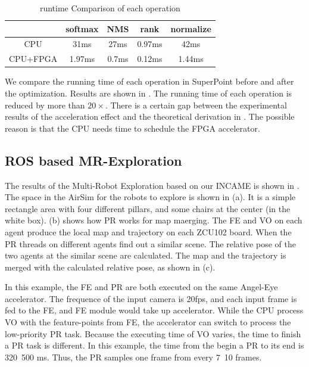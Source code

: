 \begin{table}[t]
  \centering
  \caption{runtime Comparison of each operation}
\begin{tabular}{|c|c|c|c|c|}
  \hline
             &    softmax &        NMS &       rank &  normalize \bigstrut\\
  \hline
         CPU &       31ms &       27ms &       0.97ms &       42ms \bigstrut\\
  \hline
    CPU+FPGA &     1.97ms &      0.7ms &     0.12ms &     1.44ms \bigstrut\\
  \hline
  \end{tabular}  
  
  \label{tab:optimization}%
\end{table}%

We compare the running time of each operation in SuperPoint before and after the optimization. Results are shown in . The running time of each operation is reduced by more than $20\times$. There is a certain gap between the experimental results of the acceleration effect and the theoretical derivation in . The possible reason is that the CPU needs time to schedule the FPGA accelerator.

\subsection{ ROS based MR-Exploration }

The results of the Multi-Robot Exploration based on our INCAME is shown in . The space in the AirSim for the robots to explore is shown in (a). It is a simple rectangle area with four different pillars, and some chairs at the center (in the white box).  (b) shows how PR works for map maerging. The FE and VO on each agent produce the local map and trajectory on each ZCU102 board. When the PR threads on different agents find out a similar scene. The relative pose of the two agents at the similar scene are calculated. The map and the trajectory is merged with the calculated relative pose, as shown in (c).

In this example, the FE and PR are both executed on the same Angel-Eye accelerator. The frequence of the input camera is 20fps, and each input frame is fed to the FE, and FE module would take up accelerator. While the CPU process VO with the feature-points from FE, the accelerator can switch to process the low-priority PR task. Because the executing time of VO varies, the time to finish a PR task is different. In this example, the time from the begin a PR to its end is 320~500 ms. Thus, the PR samples one frame from every 7~10 frames.